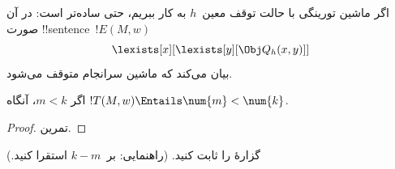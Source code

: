 \documentclass[../../../include/open-logic-section]{subfiles}
\begin{document}
اگر ماشین تورینگی با حالت توقف معین~$h$ به کار ببریم، حتی ساده‌تر
است: در آن صورت !!{sentence}ٔ~$!E(M,w)$
\[
\lexists[x][\lexists[y][\Obj Q_h(x, y)]]
\]
بیان می‌کند که ماشین سرانجام متوقف می‌شود.

\begin{prop}
اگر $m<k$، آنگاه $!T(M,w)\Entails\num{m}<\num{k}$.
\end{prop}

\begin{proof}
تمرین.
\end{proof}

\begin{prob}
گزارهٔ  را ثابت کنید.
(راهنمایی: بر~$k-m$ استقرا کنید.)
\end{prob}
\end{document}
